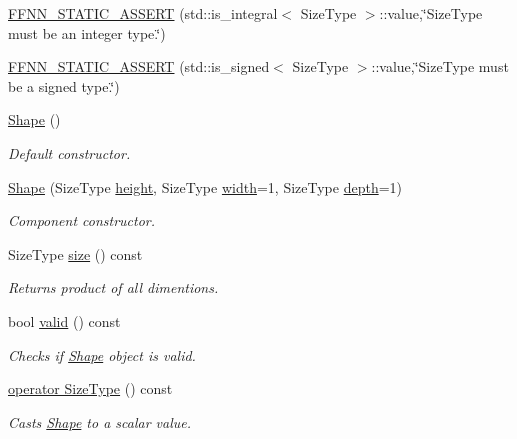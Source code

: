 \begin{DoxyCompactItemize}
\item 
\hyperlink{structffnn_1_1layer_1_1_shape_aab4fc107d498c7d36937156561d0119f}{F\-F\-N\-N\-\_\-\-S\-T\-A\-T\-I\-C\-\_\-\-A\-S\-S\-E\-R\-T} (std\-::is\-\_\-integral$<$ Size\-Type $>$\-::value,\char`\"{}Size\-Type must be an integer type.\char`\"{})
\item 
\hyperlink{structffnn_1_1layer_1_1_shape_a232bf3234a372c8a2bffe7075dcb2386}{F\-F\-N\-N\-\_\-\-S\-T\-A\-T\-I\-C\-\_\-\-A\-S\-S\-E\-R\-T} (std\-::is\-\_\-signed$<$ Size\-Type $>$\-::value,\char`\"{}Size\-Type must be a signed type.\char`\"{})
\item 
\hyperlink{structffnn_1_1layer_1_1_shape_a084eabd9eec94244907367aca6d39e4a}{Shape} ()
\begin{DoxyCompactList}\small\item\em Default constructor. \end{DoxyCompactList}\item 
\hyperlink{structffnn_1_1layer_1_1_shape_a5beff127a2bb5b14e7d831471623fd48}{Shape} (Size\-Type \hyperlink{structffnn_1_1layer_1_1_shape_a96608d7bcef7733a1b1f4782827a0c78}{height}, Size\-Type \hyperlink{structffnn_1_1layer_1_1_shape_a860cbac53d9e20bdf8283298c6369cbc}{width}=1, Size\-Type \hyperlink{structffnn_1_1layer_1_1_shape_a37ec3deb8c9f2d6617e6f63799c0fcbf}{depth}=1)
\begin{DoxyCompactList}\small\item\em Component constructor. \end{DoxyCompactList}\item 
Size\-Type \hyperlink{structffnn_1_1layer_1_1_shape_a6e8ffdbc3feeb20a1f246b3ec56e40ca}{size} () const 
\begin{DoxyCompactList}\small\item\em Returns product of all dimentions. \end{DoxyCompactList}\item 
bool \hyperlink{structffnn_1_1layer_1_1_shape_abef3f2121d2b9f132d02889cd3ceab41}{valid} () const 
\begin{DoxyCompactList}\small\item\em Checks if \hyperlink{structffnn_1_1layer_1_1_shape}{Shape} object is valid. \end{DoxyCompactList}\item 
\hyperlink{structffnn_1_1layer_1_1_shape_a10aa9362c85c14aa54e736e497b300ee}{operator Size\-Type} () const 
\begin{DoxyCompactList}\small\item\em Casts \hyperlink{structffnn_1_1layer_1_1_shape}{Shape} to a scalar value. \end{DoxyCompactList}\item 

\end{DoxyCompactItemize}
